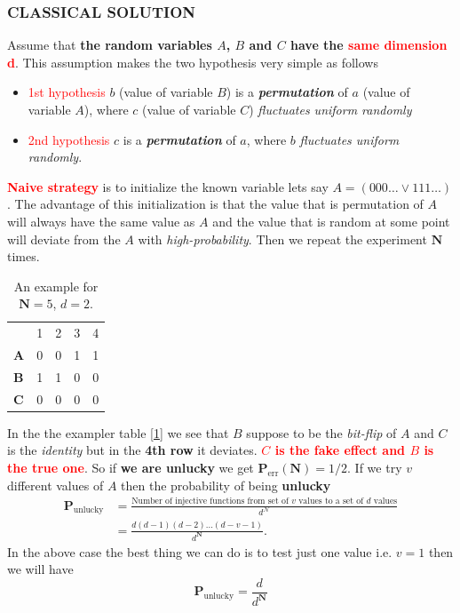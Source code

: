 \documentclass[a4paper,11pt]{article}
\begin{document}
\subsubsection{CLASSICAL SOLUTION}
Assume that \textbf{the random variables $A$, $B$ and $C$ have the \textcolor{red}{same dimension d}}. This assumption makes the two hypothesis very simple as follows
\begin{itemize}
	\item \textcolor{red}{1st hypothesis} $b$ (value of variable $B$) is a \textit{\textbf{permutation}} of $a$ (value of variable $A$), where $c$ (value of variable $C$) \textit{fluctuates uniform randomly}
	\item \textcolor{red}{2nd hypothesis} $c$ is a \textit{\textbf{permutation}} of $a$, where $b$ \textit{fluctuates uniform randomly}.
\end{itemize}
\noindent\textbf{\textcolor{red}{Naive strategy}} is to initialize the known variable lets say $A=(000\ldots \lor 111\ldots)$. The advantage of this initialization is that the value that is permutation of $A$ will always have the same value as $A$ and the value that is random at some point will deviate from the $A$ with \textit{high-probability}. Then we repeat the experiment $\mathbf{N}$ times.
\begin{table}[tbh!]
	\centering
\begin{tabular}{lllll}
	& 1 & 2 & 3 & 4 \\ \cline{1-1}
	\multicolumn{1}{|l|}{\textbf{A}} & 0 & 0 & 1 & 1 \\ \cline{1-1}
	\multicolumn{1}{|l|}{\textbf{B}} & 1 & 1 & 0 & 0 \\ \cline{1-1}
	\multicolumn{1}{|l|}{\textbf{C}} & 0 & 0 & 0 & 0 \\ \cline{1-1}
	\end{tabular}
\caption{An example for $\mathbf{N}=5$, $d=2$.}

\label{tab:simple-example-intermediary}
\end{table}
In the the exampler table [\ref{tab:simple-example-intermediary}] we see that $B$ suppose to be the \textit{bit-flip} of $A$ and $C$ is the \textit{identity} but in the \textbf{4th row} it deviates. \textbf{\textcolor{red}{$C$ is the fake effect and $B$ is the true one}}. So if \textbf{we are unlucky} we get $\mathbf{P}_\text{err}(\mathbf{N})=1/2$. If we try $v$ different values of $A$ then the probability of being \textbf{unlucky}
\begin{align}
	\mathbf{P}_\text{unlucky} &= \frac{\text{Number of injective functions from set of $v$ values to a set of $d$ values}}{d^\mathcal{N}}\\
	&=\frac{d(d-1)(d-2)...(d-v-1)}{d^\mathbf{N}}.
\end{align}
In the above case the best thing we can do is to test just one value i.e. $v=1$ then we will have
\begin{equation}
	\mathbf{P}_\text{unlucky}=\frac{d}{d^\mathbf{N}}
\end{equation}
\\
\end{document}

